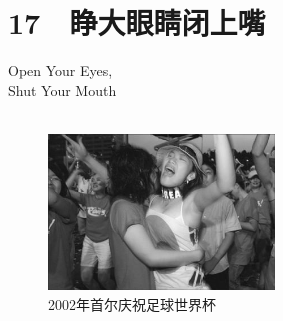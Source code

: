 \fancyhead[RO]{{\tiny{\textcolor{Gray}{\FA \ }}}\thepage}
\fancyhead[LE]{{\tiny{\textcolor{Gray}{\FA \ }}}\thepage}
\fancyfoot[LE,RO]{}
\fancyfoot[LO,CE]{}
\fancyfoot[CO,RE]{}
\chapter*{17 {\FA } 睁大眼睛闭上嘴}
\begin{flushright}
	\textcolor{PinYinColor}{\EN \huge{Open Your Eyes,\\
	Shut Your Mouth\\
	\ \\}}
\end{flushright}

\begin{figure}[!htbp]
\centering
\includegraphics[width=6cm]{./Chapters/Images/17.jpg}
\caption*{2002年首尔庆祝足球世界杯}
\end{figure}

